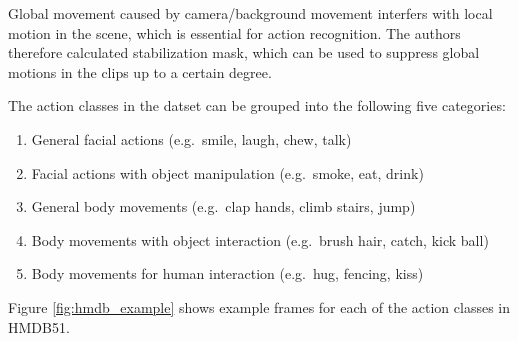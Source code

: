 Global movement caused by camera/background movement interfers with local motion in the scene, which is essential for action recognition.
The authors therefore calculated stabilization mask, which can be used to suppress global motions in the clips up to a certain degree. \cite{kuehne_hmdb:_2011}

The action classes in the datset can be grouped into the following five categories: \cite{kuehne_hmdb:_2011}
\begin{enumerate}
    \item General facial actions (e.g.\ smile, laugh, chew, talk)
    \item Facial actions with object manipulation (e.g.\ smoke, eat, drink)
    \item General body movements (e.g.\ clap hands, climb stairs, jump)
    \item Body movements with object interaction (e.g.\ brush hair, catch, kick ball)
    \item Body movements for human interaction (e.g.\ hug, fencing, kiss)
\end{enumerate}

Figure \ref{fig:hmdb_example} shows example frames for each of the action classes in HMDB51.

